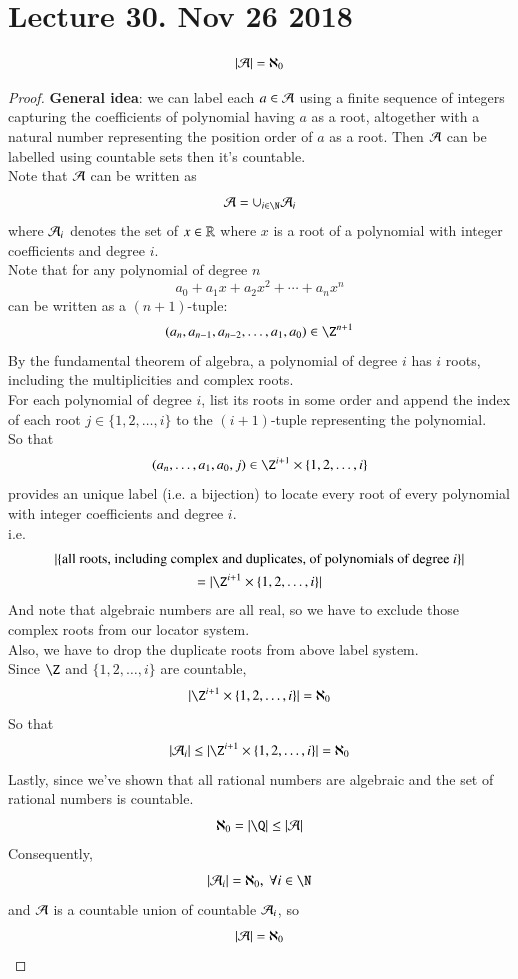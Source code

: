 \documentclass[10pt]{article}
\begin{document}
	\section{Lecture 30. Nov 26 2018}
		\begin{theorem}
			\[
				|\mathcal{{A}}| = \aleph_0
			\]
		\end{theorem}
		\begin{proof}
			\textbf{General idea}: we can label each $a \in \mathcal{{A}}$ using a finite sequence of integers capturing the coefficients of polynomial having $a$ as a root, altogether with a natural number representing the position order of $a$ as a root. Then $\mathcal{{A}}$ can be labelled using countable sets then it's countable.\\
			Note that $\mathcal{{A}}$ can be written as
			\[
				\mc{A} = \cup_{i \in \N} \mc{A}_i
			\]
			where $\mathcal{{A}}_i$ denotes the set of $x \in \mathbb{R}$ where $x$ is a root of a polynomial with integer coefficients and degree $i$. \\
			Note that for any polynomial of degree $n$
			\[
				a_0 + a_1 x + a_2 x^2 + \cdots + a_n x^n
			\]
			can be written as a $(n + 1)$-tuple:
			\[
				(a_n, a_{n-1}, a_{n-2}, \dots, a_1, a_0) \in \Z^{n+1}
			\]
			By the fundamental theorem of algebra, a polynomial of degree $i$ has $i$ roots, including the multiplicities and complex roots. \\
			For each polynomial of degree $i$, list its roots in some order and append the index of each root $j \in \{1,2,\dots,i\}$ to the $(i+1)$-tuple representing the polynomial. \\
			So that 
			\[
				(a_n, \dots, a_1, a_0, j) \in \Z^{i+1}\times \{1,2,\dots,i\}
			\]
			provides an unique label (i.e. a bijection) to locate every root of every polynomial with integer coefficients and degree $i$. \\
			i.e.
			\begin{gather*}
				|\{\tx{all roots, including complex and duplicates, of polynomials of degree $i$}\}| \\
				= |\Z^{i+1}\times \{1,2,\dots,i\}|
			\end{gather*}
			And note that algebraic numbers are all real, so we have to exclude those complex roots from our locator system. \\
			Also, we have to drop the duplicate roots from above label system. \\
			Since $\Z$ and $\{1,2,\dots,i\}$ are countable,
			\[
				|\Z^{i+1}\times \{1,2,\dots,i\}| = \aleph_0
			\]
			So that 
			\[
				|\mc{A}_i| \leq |\Z^{i+1}\times \{1,2,\dots,i\}| = \aleph_0
			\]
			Lastly, since we've shown that all rational numbers are algebraic and the set of rational numbers is countable. 
			\[
				\aleph_0 = |\Q| \leq |\mc{A}|
			\]
			Consequently,
			\[
				|\mc{A}_i| = \aleph_0,\ \forall i \in \N
			\]
			and $\mathcal{{A}}$ is a countable union of countable $\mathcal{{A}}_i$, so 
			\[
				|\mathcal{{A}}| = \aleph_0
			\]
		\end{proof}
		
\end{document}
